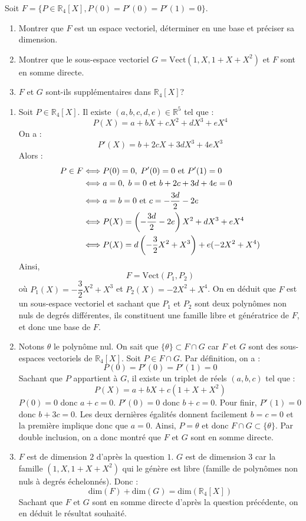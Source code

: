 \documentclass[a4paper,10pt]{report}
\begin{document}
\begin{Exercice}{} Soit $F = \lbrace P \in \mathbb{R}_4[X], P(0)=P'(0)=P'(1)=0 \rbrace$.

\begin{enumerate}
\item Montrer que $F$ est un espace vectoriel, déterminer en une base et préciser sa dimension.
\item Montrer que le sous-espace vectoriel $G= \textrm{Vect}(1,X,1+X+X^2)$ et $F$  sont en somme directe.
\item $F$ et $G$ sont-ils supplémentaires dans $\mathbb{R}_4[X]$?
\end{enumerate}
\end{Exercice}

\corr 

\begin{enumerate}
\item Soit $P \in \mathbb{R}_4[X]$. Il existe $(a,b,c,d,e) \in \mathbb{R}^5$ tel que :
$$ P(X) = a+bX+cX^2+dX^3+eX^4$$
On a :
$$ P'(X) = b+2cX+3dX^3+4eX^3$$
Alors :
\begin{align*}
P \in F & \Longleftrightarrow P(0)=0, \; P'(0)=0 \hbox{ et } P'(1)=0 \\
& \Longleftrightarrow a=0, \; b=0 \hbox{ et } b+2c+3d+4e = 0 \\
& \Longleftrightarrow a=b=0 \hbox{ et } c= -\dfrac{3d}{2} - 2e \\
& \Longleftrightarrow P(X) = \left( -\dfrac{3d}{2} - 2e \right)X^2 + d X^3 + eX^4 \\
& \Longleftrightarrow P(X) = d \left( - \dfrac{3}{2}X^2+ X^3 \right) + e (-2X^2+X^4)
\end{align*}
Ainsi,
$$ F= \textrm{Vect}(P_1,P_2)$$
où $P_1(X) = - \dfrac{3}{2}X^2+ X^3$ et $P_2(X)= -2X^2+X^4$. On en déduit que $F$ est un sous-espace vectoriel et sachant que $P_1$ et $P_2$ sont deux polynômes non nuls de degrés différentes, ils constituent une famille libre et génératrice de $F$, et donc une base de $F$.
\item Notons $\theta$ le polynôme nul. On sait que $\lbrace \theta \rbrace \subset F \cap G$ car $F$ et $G$ sont des sous-espaces vectoriels de $\mathbb{R}_4[X]$. Soit $P \in F \cap G$. Par définition, on a :
$$ P(0)=P'(0)=P'(1)=0$$
Sachant que $P$ appartient à $G$, il existe un triplet de réels $(a,b,c)$ tel que :
$$ P(X)= a + bX + c(1+X+X^2)$$
$P(0)=0$ donc $a+c=0$. $P'(0)=0$ donc $b+c=0$. Pour finir, $P'(1)=0$ donc $b+3c=0$. Les deux dernières égalités donnent facilement $b=c=0$ et la première implique donc que $a=0$. Ainsi, $P= \theta$ et donc $ F \cap G \subset \lbrace \theta \rbrace$. Par double inclusion, on a donc montré que $F$ et $G$ sont en somme directe.
\item $F$ est de dimension $2$ d'après la question $1$. $G$ est de dimension $3$ car la famille $(1,X,1+X+X^2)$ qui le génère est libre (famille de polynômes non nuls à degrés échelonnés). Donc :
$$ \textrm{dim}(F)+ \textrm{dim}(G) = \textrm{dim}(\mathbb{R}_4[X])$$
Sachant que $F$ et $G$ sont en somme directe d'après la question précédente, on en déduit le résultat souhaité.
\end{enumerate}
\end{document}
